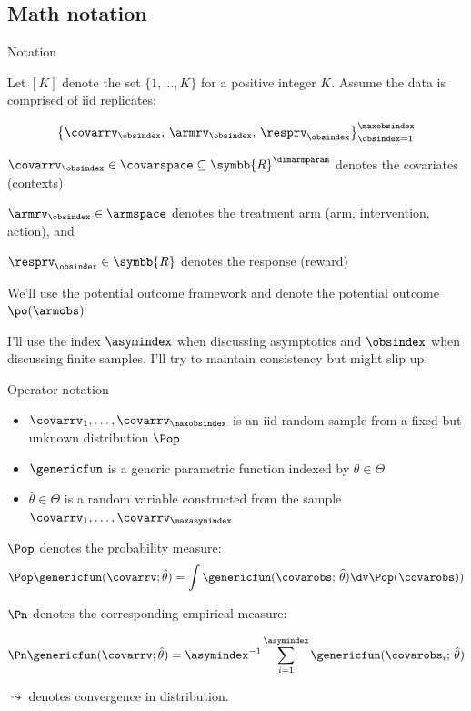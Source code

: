 \documentclass[aspectratio=169, professionalfonts]{beamer}
\begin{document}
\subsection{Math notation}
\begin{frame}[label={sec:org00d2d44}]{Notation}

	Let $[K]$ denote the set $\{1, \ldots, K \}$ for a positive integer $K$. Assume
	the data is comprised of iid replicates:

	\begin{equation*}
		\left\{{\covarrv}_{\obsindex},\, {\armrv}_{\obsindex},\,
		{\resprv}_{\obsindex} \right\}_{\obsindex = 1}^{\maxobsindex}
	\end{equation*}


	$\covarrv_{\obsindex} \in \covarspace \subseteq
		\symbb{R}^{\dimarmparam}$ denotes the covariates (contexts)

	$\armrv_{ \obsindex} \in \armspace$ denotes the treatment arm (arm,
	intervention, action), and

	$\resprv_{ \obsindex} \in \symbb{R}$ denotes the response (reward)

	\vfill \pause

	We'll use the potential outcome framework and denote the potential outcome 	$\po(\armobs)$

	\vfill \pause
	I'll use the index $\asymindex$ when discussing asymptotics and $\obsindex$ when discussing finite samples.	I'll try to maintain consistency but might slip up.
\end{frame}


\begin{frame}{Operator notation}
	\begin{itemize}
		\item $\covarrv_1, \ldots, \covarrv_{\maxobsindex}$ is an iid random sample from a
		      fixed but unknown distribution $\Pop$
		\item $\genericfun$ is a generic parametric function indexed by $\theta \in \Theta$
		\item $\hat{\theta} \in \Theta$ is a random variable constructed from the sample
		      $\covarrv_1, \ldots, \covarrv_{\maxasymindex}$
	\end{itemize}
	\vfill \pause

	$\Pop$ denotes the probability measure:
	\begin{equation*}
		\Pop \genericfun(\covarrv; \hat{\theta}) = \int \genericfun(\covarobs;\,\widehat{\theta}) \dv
		\Pop(\covarobs))
	\end{equation*}

	\vfill \pause $\Pn$ denotes the corresponding empirical measure:

	\begin{equation*}
		\Pn \genericfun(\covarrv; \hat{\theta}) = \asymindex^{-1}\sum_{i =
			1}^{\asymindex} \genericfun(\covarobs_{i};\,\hat{\theta})
	\end{equation*}
	\vfill \pause

	$\leadsto$ denotes convergence in distribution.

	\vfill
\end{frame}
\end{document}
